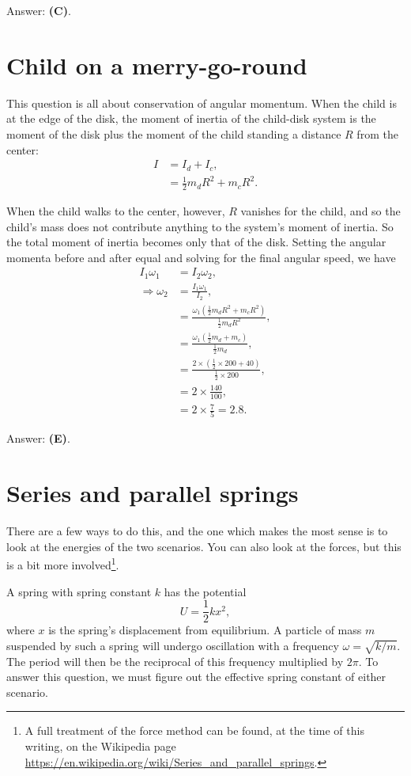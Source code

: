 \documentclass[11pt]{paper}
\newcommand{\answer}[1]{Answer: \textbf{(#1)}.}
\begin{document}
\answer{C}

\section{Child on a merry-go-round}
This question is all about conservation of angular momentum.  When the child is at the edge of the disk, the moment of inertia of the child-disk system is the moment of the disk plus the moment of the child standing a distance $R$ from the center:
\begin{align}
	I &= I_d + I_c,\\
	&= \frac{1}{2}m_dR^2 + m_cR^2.
\end{align}

When the child walks to the center, however, $R$ vanishes for the child, and so the child's mass does not contribute anything to the system's moment of inertia.  So the total moment of inertia becomes only that of the disk.  Setting the angular momenta before and after equal and solving for the final angular speed, we have
\begin{align}
	I_1 \omega_1 &= I_2 \omega_2,\\
	\Rightarrow \omega_2 &= \frac{I_1 \omega_1}{I_2},\\
	&= \frac{\omega_1\left(\frac{1}{2}m_dR^2 + m_cR^2\right)}{\frac{1}{2}m_dR^2},\\
	&=\frac{\omega_1\left(\frac{1}{2}m_d + m_c\right)}{\frac{1}{2}m_d},\\
	&=\frac{2\times\left(\frac{1}{2}\times200 + 40\right)}{\frac{1}{2}\times200},\\
	&= 2\times\frac{140}{100},\\
	&=2\times\frac{7}{5} = 2.8.
	\end{align}
	
\answer{E}

\section{Series and parallel springs}
There are a few ways to do this, and the one which makes the most sense is to look at the energies of the two scenarios.  You can also look at the forces, but this is a bit more involved\footnote{A full treatment of the force method can be found, at the time of this writing, on the Wikipedia page \url{https://en.wikipedia.org/wiki/Series_and_parallel_springs}.}.

A spring with spring constant $k$ has the potential
\begin{equation}
	U = \frac{1}{2}kx^2,
\end{equation}
where $x$ is the spring's displacement from equilibrium.  A particle of mass $m$ suspended by such a spring will undergo oscillation with a frequency $\omega = \sqrt{k/m}$.  The period will then be the reciprocal of this frequency multiplied by $2\pi$.  To answer this question, we must figure out the effective spring constant of either scenario.
\end{document}

